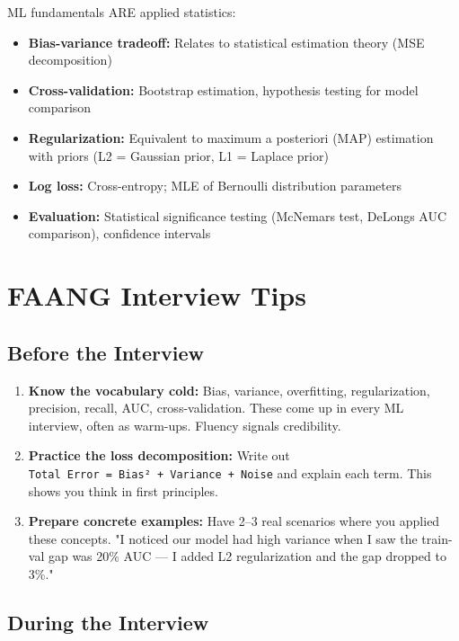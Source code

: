\documentclass[11pt]{article}
\providecommand{\tightlist}{\setlength{\itemsep}{1pt}\setlength{\parskip}{0pt}}
\begin{document}
ML fundamentals ARE applied statistics:

\begin{itemize}
\tightlist
\item
  \textbf{Bias-variance tradeoff:} Relates to statistical estimation theory (MSE decomposition)
\item
  \textbf{Cross-validation:} Bootstrap estimation, hypothesis testing for model comparison
\item
  \textbf{Regularization:} Equivalent to maximum a posteriori (MAP) estimation with priors (L2 = Gaussian prior, L1 = Laplace prior)
\item
  \textbf{Log loss:} Cross-entropy; MLE of Bernoulli distribution parameters
\item
  \textbf{Evaluation:} Statistical significance testing (McNemar\textquotesingle s test, DeLong\textquotesingle s AUC comparison), confidence intervals
\end{itemize}

\section{FAANG Interview Tips}\label{faang-interview-tips}

\subsection{Before the Interview}\label{before-the-interview}

\begin{enumerate}
\def\labelenumi{\arabic{enumi}.}
\item
  \textbf{Know the vocabulary cold:} Bias, variance, overfitting, regularization, precision, recall, AUC, cross-validation. These come up in every ML interview, often as warm-ups. Fluency signals credibility.
\item
  \textbf{Practice the loss decomposition:} Write out \texttt{Total\ Error\ =\ Bias²\ +\ Variance\ +\ Noise} and explain each term. This shows you think in first principles.
\item
  \textbf{Prepare concrete examples:} Have 2--3 real scenarios where you applied these concepts. "I noticed our model had high variance when I saw the train-val gap was 20\% AUC --- I added L2 regularization and the gap dropped to 3\%."
\end{enumerate}

\subsection{During the Interview}\label{during-the-interview}
\end{document}

